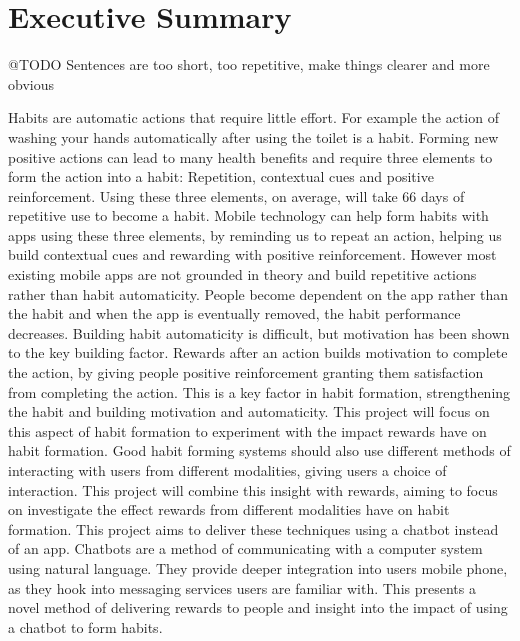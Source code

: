 \section*{Executive Summary}

@TODO Sentences are too short, too repetitive, make things clearer and more obvious

Habits are automatic actions that require little effort. For example the action of washing your hands automatically after using the toilet is a habit. Forming new positive actions can lead to many health benefits and require three elements to form the action into a habit: Repetition, contextual cues and positive reinforcement. Using these three elements, on average, will take 66 days of repetitive use to become a habit.\newline
\newline
Mobile technology can help form habits with apps using these three elements, by reminding us to repeat an action, helping us build contextual cues and rewarding with positive reinforcement. However most existing mobile apps are not grounded in theory and build repetitive actions rather than habit automaticity. People become dependent on the app rather than the habit and when the app is eventually removed, the habit performance decreases. Building habit automaticity is difficult, but motivation has been shown to the key building factor. Rewards after an action builds motivation to complete the action, by giving people positive reinforcement granting them satisfaction from completing the action. This is a key factor in habit formation, strengthening the habit and building motivation and automaticity. This project will focus on this aspect of habit formation to experiment with the impact rewards have on habit formation.\newline
\newline
Good habit forming systems should also use different methods of interacting with users from different modalities, giving users a choice of interaction. This project will combine this insight with rewards, aiming to focus on investigate the effect rewards from different modalities have on habit formation.\newline
\newline
This project aims to deliver these techniques using a chatbot instead of an app. Chatbots are a method of communicating with a computer system using natural language. They provide deeper integration into users mobile phone, as they hook into messaging services users are familiar with. This presents a novel method of delivering rewards to people and insight into the impact of using a chatbot to form habits.\newline

